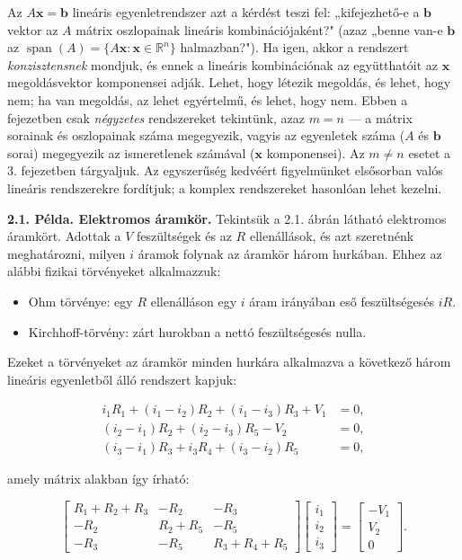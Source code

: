 \documentclass[
  magyar,
  11pt]{article}
\providecommand{\tightlist}{%
  \setlength{\itemsep}{0pt}\setlength{\parskip}{0pt}}
\providecommand{\boldsymbol}[1]{\mathbf{#1}}
\begin{document}
Az \(A\boldsymbol{x} = \boldsymbol{b}\) lineáris egyenletrendszer azt a
kérdést teszi fel: „kifejezhető-e a \(\boldsymbol{b}\) vektor az \(A\)
mátrix oszlopainak lineáris kombinációjaként?" (azaz „benne van-e
\(\boldsymbol{b}\) az
\(\operatorname{span}(A) = \{A\boldsymbol{x} : \boldsymbol{x} \in \mathbb{R}^n\}\)
halmazban?"). Ha igen, akkor a rendszert \emph{konzisztensnek} mondjuk,
és ennek a lineáris kombinációnak az együtthatóit az \(\boldsymbol{x}\)
megoldásvektor komponensei adják. Lehet, hogy létezik megoldás, és
lehet, hogy nem; ha van megoldás, az lehet egyértelmű, és lehet, hogy
nem. Ebben a fejezetben csak \emph{négyzetes} rendszereket tekintünk,
azaz \(m = n\) --- a mátrix sorainak és oszlopainak száma megegyezik,
vagyis az egyenletek száma (\(A\) és \(\boldsymbol{b}\) sorai)
megegyezik az ismeretlenek számával (\(\boldsymbol{x}\) komponensei). Az
\(m \neq n\) esetet a 3. fejezetben tárgyaljuk. Az egyszerűség kedvéért
figyelmünket elsősorban valós lineáris rendszerekre fordítjuk; a komplex
rendszereket hasonlóan lehet kezelni.

\textbf{2.1. Példa. Elektromos áramkör.} Tekintsük a 2.1. ábrán látható
elektromos áramkört. Adottak a \(V\) feszültségek és az \(R\)
ellenállások, és azt szeretnénk meghatározni, milyen \(i\) áramok
folynak az áramkör három hurkában. Ehhez az alábbi fizikai törvényeket
alkalmazzuk:

\begin{itemize}
\tightlist
\item
  Ohm törvénye: egy \(R\) ellenálláson egy \(i\) áram irányában eső
  feszültségesés \(iR\).
\item
  Kirchhoff-törvény: zárt hurokban a nettó feszültségesés nulla.
\end{itemize}

Ezeket a törvényeket az áramkör minden hurkára alkalmazva a következő
három lineáris egyenletből álló rendszert kapjuk:

\[\begin{aligned}
i_1 R_1 + (i_1 - i_2) R_2 + (i_1 - i_3) R_3 + V_1 &= 0, \\
(i_2 - i_1) R_2 + (i_2 - i_3) R_5 - V_2 &= 0, \\
(i_3 - i_1) R_3 + i_3 R_4 + (i_3 - i_2) R_5 &= 0,
\end{aligned}\]

amely mátrix alakban így írható:

\[\begin{bmatrix} R_1 + R_2 + R_3 & -R_2 & -R_3 \\ -R_2 & R_2 + R_5 & -R_5 \\ -R_3 & -R_5 & R_3 + R_4 + R_5 \end{bmatrix} \begin{bmatrix} i_1 \\ i_2 \\ i_3 \end{bmatrix} = \begin{bmatrix} -V_1 \\ V_2 \\ 0 \end{bmatrix}.\]
\end{document}
